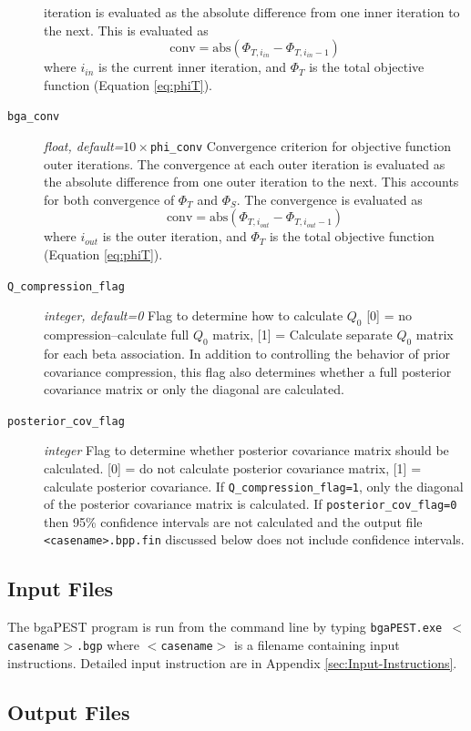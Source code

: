 \documentclass[11pt,oneside,onecolumn]{usgsreport}
\begin{document}
\begin{multicols}{2}
\begin{bibunit}
\begin{description}
iteration is evaluated as the absolute difference from one inner iteration
to the next. This is evaluated as
\[
\mathrm{conv}=\mathrm{abs}\left(\Phi_{T,i_{in}}-\Phi_{T,i_{in}-1}\right)
\]
 where\emph{ $i_{in}$ }is the current inner iteration, and $\Phi_{T}$
is the total objective function (Equation \ref{eq:phiT}). 
\item [{\texttt{bga\_conv}}] \emph{float, default=$10\times$}\texttt{phi\_conv}\emph{
}Convergence criterion for objective function outer iterations. The
convergence at each outer iteration is evaluated as the absolute difference
from one outer iteration to the next. This accounts for both convergence
of $\Phi_{T}$ and $\Phi_{S}$. The convergence
is evaluated as 
\[
\mathrm{conv}=\mathrm{abs}\left(\Phi_{T,i_{out}}-\Phi_{T,i_{out}-1}\right)
\]
where $i_{out}$ is the outer iteration, and $\Phi_{T}$
is the total objective function (Equation \ref{eq:phiT}).\emph{ }
\item [{\texttt{Q\_compression\_flag}}] \emph{integer, default=0} Flag
to determine how to calculate $Q_{0}$ {[}0{]} = no compression--calculate
full $Q_{0}$ matrix, {[}1{]} = Calculate separate $Q_{0}$ matrix
for each beta association. In addition to controlling the behavior
of prior covariance compression, this flag also determines whether
a full posterior covariance matrix or only the diagonal are calculated.

\item [{\texttt{posterior\_cov\_flag}}] \emph{integer }Flag to determine
whether posterior covariance matrix should be calculated. {[}0{]}
= do not calculate posterior covariance matrix, {[}1{]} = calculate
posterior covariance. If \texttt{Q\_compression\_flag=1}, only the
diagonal of the posterior covariance matrix is calculated. If \texttt{posterior\_cov\_flag=0}
then 95\% confidence intervals are not calculated and the output file
\texttt{<casename>.bpp.fin} discussed below does not include confidence
intervals.
\end{description}

\subsection{Input Files}

The bgaPEST program is run from the command line by typing \texttt{bgaPEST.exe $<$casename$>$.bgp}
where \texttt{$<$casename$>$} is a filename containing input instructions.
Detailed input instruction are in Appendix \ref{sec:Input-Instructions}.


\subsection{Output Files}


\end{bibunit}
\end{multicols}
\end{document}
